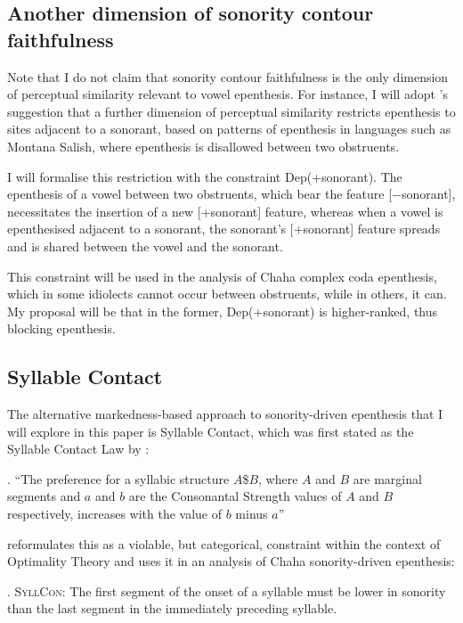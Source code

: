 \documentclass[12pt]{article}
\begin{document}
\subsection{Another dimension of sonority contour faithfulness}

Note that I do not claim that sonority contour faithfulness is the only dimension of perceptual similarity relevant to vowel epenthesis. For instance, I will adopt \citet{flemming.2008}'s suggestion that a further dimension of perceptual similarity restricts epenthesis to sites adjacent to a sonorant, based on patterns of epenthesis in languages such as Montana Salish, where epenthesis is disallowed between two obstruents. 

I will formalise this restriction with the constraint {\sc Dep(+sonorant)}. The epenthesis of a vowel between two obstruents, which bear the feature [$-$sonorant], necessitates the insertion of a new [+sonorant] feature, whereas when a vowel is epenthesised adjacent to a sonorant, the sonorant's [+sonorant] feature spreads and is shared between the vowel and the sonorant.

This constraint will be used in the analysis of Chaha complex coda epenthesis, which in some idiolects
cannot occur between obstruents, while in others, it can. My proposal will be that in the former, {\sc Dep(+sonorant)} is higher-ranked, thus blocking epenthesis.

\subsection{Syllable Contact} 

The alternative markedness-based approach to sonority-driven epenthesis that I will explore in this paper is Syllable Contact, which was first stated as the Syllable Contact Law by \citet{murray.vennemann.1983}:

\ex. ``The preference for a syllabic structure $A$\$$B$, where $A$ and $B$ are marginal segments and $a$ and $b$ are the Consonantal Strength
values of $A$ and $B$ respectively, increases with the value of $b$ minus $a$'' \citep{murray.vennemann.1983}

\citet{rose.2000} reformulates this as a violable, but categorical, constraint within the context of Optimality Theory and uses it in an analysis of Chaha sonority-driven epenthesis:

\ex.  \textsc{SyllCon}: The first segment of the onset of a syllable must be lower in sonority than the last segment in the immediately preceding syllable.
\end{document}
